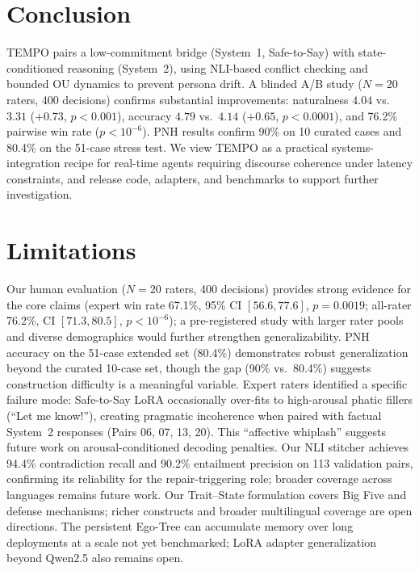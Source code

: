 \documentclass[11pt]{article}
\begin{document}
\section{Conclusion}

TEMPO pairs a low-commitment bridge (System~1, Safe-to-Say) with state-conditioned reasoning (System~2), using NLI-based conflict checking and bounded OU dynamics to prevent persona drift.
A blinded A/B study ($N{=}20$ raters, 400 decisions) confirms substantial improvements: naturalness $4.04$ vs.\ $3.31$ ($+0.73$, $p{<}0.001$), accuracy $4.79$ vs.\ $4.14$ ($+0.65$, $p{<}0.0001$), and 76.2\% pairwise win rate ($p{<}10^{-6}$). PNH results confirm 90\% on 10 curated cases and 80.4\% on the 51-case stress test.
We view TEMPO as a practical systems-integration recipe for real-time agents requiring discourse coherence under latency constraints, and release code, adapters, and benchmarks to support further investigation.

\newpage

\FloatBarrier

\section*{Limitations}

Our human evaluation ($N{=}20$ raters, 400 decisions) provides strong evidence for the core claims (expert win rate 67.1\%, 95\% CI $[56.6, 77.6]$, $p{=}0.0019$; all-rater 76.2\%, CI $[71.3, 80.5]$, $p{<}10^{-6}$); a pre-registered study with larger rater pools and diverse demographics would further strengthen generalizability.
PNH accuracy on the 51-case extended set (80.4\%) demonstrates robust generalization beyond the curated 10-case set, though the gap (90\% vs.\ 80.4\%) suggests construction difficulty is a meaningful variable.
Expert raters identified a specific failure mode: Safe-to-Say LoRA occasionally over-fits to high-arousal phatic fillers (``Let me know!''), creating pragmatic incoherence when paired with factual System~2 responses (Pairs 06, 07, 13, 20). This ``affective whiplash'' suggests future work on arousal-conditioned decoding penalties.
Our NLI stitcher achieves 94.4\% contradiction recall and 90.2\% entailment precision on 113 validation pairs, confirming its reliability for the repair-triggering role; broader coverage across languages remains future work. Our Trait--State formulation covers Big Five and defense mechanisms; richer constructs and broader multilingual coverage are open directions.
The persistent Ego-Tree can accumulate memory over long deployments at a scale not yet benchmarked; LoRA adapter generalization beyond Qwen2.5 also remains open.
\end{document}

